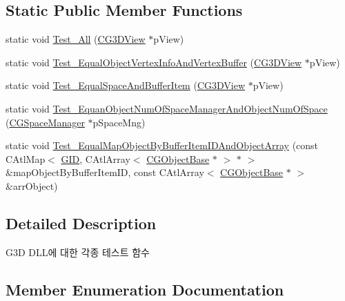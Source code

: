 \subsection*{Static Public Member Functions}
\begin{DoxyCompactItemize}
\item 
static void \hyperlink{class_c_g3_d_test_afff543dd6479c33d2b4c9dcbd1b38745}{Test\+\_\+\+All} (\hyperlink{class_c_g3_d_view}{C\+G3\+D\+View} $\ast$p\+View)
\item 
static void \hyperlink{class_c_g3_d_test_a72ac82f135a82e637f5da7d502699676}{Test\+\_\+\+Equal\+Object\+Vertex\+Info\+And\+Vertex\+Buffer} (\hyperlink{class_c_g3_d_view}{C\+G3\+D\+View} $\ast$p\+View)
\item 
static void \hyperlink{class_c_g3_d_test_ad89cc1d3fb2fe8b5e0c57ac66144846f}{Test\+\_\+\+Equal\+Space\+And\+Buffer\+Item} (\hyperlink{class_c_g3_d_view}{C\+G3\+D\+View} $\ast$p\+View)
\item 
static void \hyperlink{class_c_g3_d_test_acbfd7d7066ae6a5b050b597263044445}{Test\+\_\+\+Equan\+Object\+Num\+Of\+Space\+Manager\+And\+Object\+Num\+Of\+Space} (\hyperlink{class_c_g_space_manager}{C\+G\+Space\+Manager} $\ast$p\+Space\+Mng)
\item 
static void \hyperlink{class_c_g3_d_test_a5c60e0ec7fdd6ef5fe508542e1f5fe31}{Test\+\_\+\+Equal\+Map\+Object\+By\+Buffer\+Item\+I\+D\+And\+Object\+Array} (const C\+Atl\+Map$<$ \hyperlink{_g_types_8h_a5b96ecb16d8e437977d12cd40aa6f6d8}{G\+I\+D}, C\+Atl\+Array$<$ \hyperlink{class_c_g_object_base}{C\+G\+Object\+Base} $\ast$ $>$ $\ast$ $>$ \&map\+Object\+By\+Buffer\+Item\+I\+D, const C\+Atl\+Array$<$ \hyperlink{class_c_g_object_base}{C\+G\+Object\+Base} $\ast$ $>$ \&arr\+Object)
\end{DoxyCompactItemize}


\subsection{Detailed Description}

\begin{DoxyItemize}
\item G3\+D D\+L\+L에 대한 각종 테스트 함수 
\end{DoxyItemize}

\subsection{Member Enumeration Documentation}
\hypertarget{class_c_g3_d_test_a41271919eb70fb469b62f7c5dd7dbb17}{}
